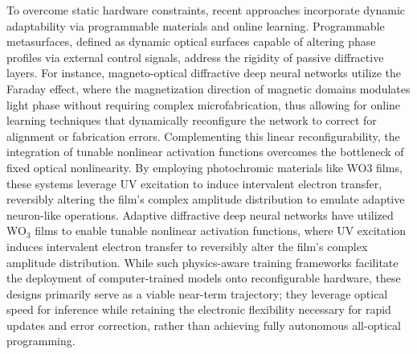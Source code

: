 \documentclass[11pt]{article}
\begin{document}
To overcome static hardware constraints, recent approaches incorporate dynamic adaptability via programmable materials and online learning. Programmable metasurfaces, defined as dynamic optical surfaces capable of altering phase profiles via external control signals, address the rigidity of passive diffractive layers. For instance, magneto-optical diffractive deep neural networks utilize the Faraday effect, where the magnetization direction of magnetic domains modulates light phase without requiring complex microfabrication, thus allowing for online learning techniques that dynamically reconfigure the network to correct for alignment or fabrication errors. Complementing this linear reconfigurability, the integration of tunable nonlinear activation functions overcomes the bottleneck of fixed optical nonlinearity. By employing photochromic materials like WO3 films, these systems leverage UV excitation to induce intervalent electron transfer, reversibly altering the film's complex amplitude distribution to emulate adaptive neuron-like operations. Adaptive diffractive deep neural networks have utilized WO\(_{3}\) films to enable tunable nonlinear activation functions, where UV excitation induces intervalent electron transfer to reversibly alter the film's complex amplitude distribution. \citep{doi_10_1002_lpor_202500558_72fd7a4f} While such physics-aware training frameworks facilitate the deployment of computer-trained models onto reconfigurable hardware, these designs primarily serve as a viable near-term trajectory; they leverage optical speed for inference while retaining the electronic flexibility necessary for rapid updates and error correction, rather than achieving fully autonomous all-optical programming. \citep{s2_44f5e5b7573063092084a20caab78ea8a4e2407e_dd441649} \citep{doi_10_1002_lpor_202500558_72fd7a4f} \citep{doi_10_1002_lpor_202200348_d54cae18}
\end{document}
